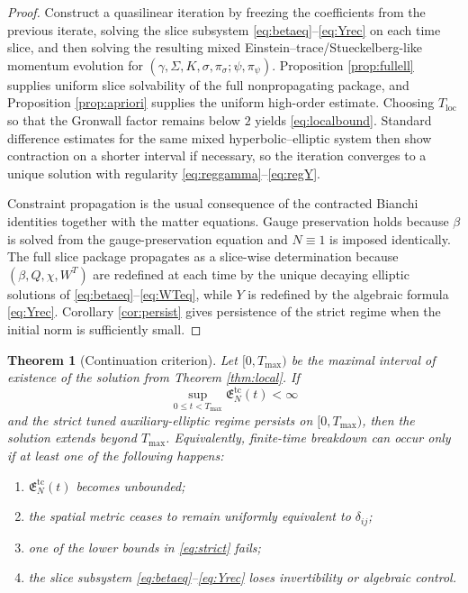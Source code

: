 \documentclass[11pt]{article}
\newtheorem{theorem}{Theorem}
\begin{document}
\begin{proof}
Construct a quasilinear iteration by freezing the coefficients from the previous iterate, solving the slice subsystem \eqref{eq:betaeq}--\eqref{eq:Yrec} on each time slice, and then solving the resulting mixed Einstein--trace/Stueckelberg-like momentum evolution for \((\gamma,\Sigma,K,\sigma,\pi_\sigma;\psi,\pi_\psi)\). Proposition \ref{prop:fullell} supplies uniform slice solvability of the full nonpropagating package, and Proposition \ref{prop:apriori} supplies the uniform high-order estimate. Choosing \(T_{\mathrm{loc}}\) so that the Gronwall factor remains below \(2\) yields \eqref{eq:localbound}. Standard difference estimates for the same mixed hyperbolic--elliptic system then show contraction on a shorter interval if necessary, so the iteration converges to a unique solution with regularity \eqref{eq:reggamma}--\eqref{eq:regY}.

Constraint propagation is the usual consequence of the contracted Bianchi identities together with the matter equations. Gauge preservation holds because \(\beta\) is solved from the gauge-preservation equation and \(N\equiv 1\) is imposed identically. The full slice package propagates as a slice-wise determination because \((\beta,Q,\chi,W^T)\) are redefined at each time by the unique decaying elliptic solutions of \eqref{eq:betaeq}--\eqref{eq:WTeq}, while \(Y\) is redefined by the algebraic formula \eqref{eq:Yrec}. Corollary \ref{cor:persist} gives persistence of the strict regime when the initial norm is sufficiently small.
\end{proof}

\begin{theorem}[Continuation criterion]
\label{thm:cont}
Let \([0,T_{\max})\) be the maximal interval of existence of the solution from Theorem \ref{thm:local}. If
\begin{equation}
\sup_{0\le t<T_{\max}}\mathfrak E_N^{\mathrm{tc}}(t)<\infty
\label{eq:Enbounded}
\end{equation}
and the strict tuned auxiliary-elliptic regime persists on \([0,T_{\max})\), then the solution extends beyond \(T_{\max}\). Equivalently, finite-time breakdown can occur only if at least one of the following happens:
\begin{enumerate}
    \item \(\mathfrak E_N^{\mathrm{tc}}(t)\) becomes unbounded;
    \item the spatial metric ceases to remain uniformly equivalent to \(\delta_{ij}\);
    \item one of the lower bounds in \eqref{eq:strict} fails;
    \item the slice subsystem \eqref{eq:betaeq}--\eqref{eq:Yrec} loses invertibility or algebraic control.
\end{enumerate}
\end{theorem}
\end{document}

